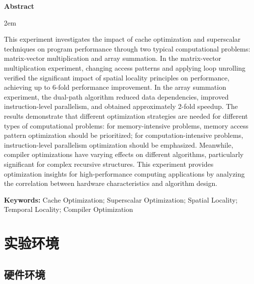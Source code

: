 \documentclass[a4paper,colorlinks=true,linkcolor=blue,urlcolor=blue,citecolor=green,bookmarks=true]{article}
\newenvironment{enabstract}{
    \par\small
    \noindent\mbox{}\par\vspace{-\baselineskip}
    \par\parindent 2em
    }
    {\par\vspace{1em}}
\begin{document}
\begin{center}{\bfseries{Abstract}}\end{center}\par\vspace{0.5em}
\begin{enabstract}
This experiment investigates the impact of cache optimization and superscalar techniques on program performance through two typical computational problems: matrix-vector multiplication and array summation. In the matrix-vector multiplication experiment, changing access patterns and applying loop unrolling verified the significant impact of spatial locality principles on performance, achieving up to 6-fold performance improvement. In the array summation experiment, the dual-path algorithm reduced data dependencies, improved instruction-level parallelism, and obtained approximately 2-fold speedup. The results demonstrate that different optimization strategies are needed for different types of computational problems: for memory-intensive problems, memory access pattern optimization should be prioritized; for computation-intensive problems, instruction-level parallelism optimization should be emphasized. Meanwhile, compiler optimizations have varying effects on different algorithms, particularly significant for complex recursive structures. This experiment provides optimization insights for high-performance computing applications by analyzing the correlation between hardware characteristics and algorithm design.

\vspace{1em}
\noindent\textbf{Keywords:} Cache Optimization; Superscalar Optimization; Spatial Locality; Temporal Locality; Compiler Optimization
\end{enabstract}

\clearpage
\tableofcontents
\clearpage

\section{实验环境}

\subsection{硬件环境}
\end{document}
